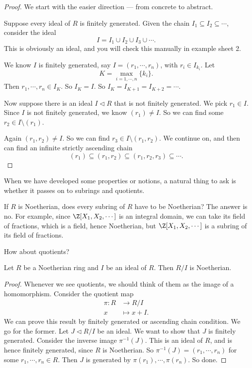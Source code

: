\documentclass[a4paper]{article}
\begin{document}
\begin{proof}
  We start with the easier direction --- from concrete to abstract.

  Suppose every ideal of $R$ is finitely generated. Given the chain $I_1 \subseteq I_2 \subseteq \cdots$, consider the ideal
  \[
    I = I_1 \cup I_2 \cup I_3 \cup \cdots.
  \]
  This is obviously an ideal, and you will check this manually in example sheet 2. %

  We know $I$ is finitely generated, say $I = (r_1, \cdots, r_n)$, with $r_i \in I_{k_i}$. Let
  \[
    K = \max_{i = 1, \cdots, n}\{k_i\}.
  \]
  Then $r_1, \cdots, r_n \in I_K$. So $I_K = I$. So $I_K = I_{K + 1} = I_{K + 2} = \cdots$.

  Now suppose there is an ideal $I \lhd R$ that is not finitely generated. We pick $r_1 \in I$. Since $I$ is not finitely generated, we know $(r_1) \not= I$. So we can find some $r_2 \in I \setminus (r_1)$.

  Again $(r_1, r_2) \not= I$. So we can find $r_3 \in I\setminus (r_1, r_2)$. We continue on, and then can find an infinite strictly ascending chain
  \[
    (r_1) \subseteq (r_1, r_2) \subseteq (r_1, r_2, r_3) \subseteq \cdots.
  \]
\end{proof}
When we have developed some properties or notions, a natural thing to ask is whether it passes on to subrings and quotients.

If $R$ is Noetherian, does every subring of $R$ have to be Noetherian? The answer is no. For example, since $\Z[X_1, X_2, \cdots]$ is an integral domain, we can take its field of fractions, which is a field, hence Noetherian, but $\Z[X_1, X_2, \cdots]$ is a subring of its field of fractions.

How about quotients?
\begin{prop}
  Let $R$ be a Noetherian ring and $I$ be an ideal of $R$. Then $R/I$ is Noetherian.
\end{prop}

\begin{proof}
  Whenever we see quotients, we should think of them as the image of a homomorphism. Consider the quotient map
  \begin{align*}
    \pi: R&\to R/I\\
    x &\mapsto x + I.
  \end{align*}
  We can prove this result by finitely generated or ascending chain condition. We go for the former. Let $J \lhd R/I$ be an ideal. We want to show that $J$ is finitely generated. Consider the inverse image $\pi^{-1}(J)$. This is an ideal of $R$, and is hence finitely generated, since $R$ is Noetherian. So $\pi^{-1}(J) = (r_1, \cdots, r_n)$ for some $r_1, \cdots, r_n \in R$. Then $J$ is generated by $\pi(r_1), \cdots, \pi(r_n)$. So done.
\end{proof}
\end{document}
